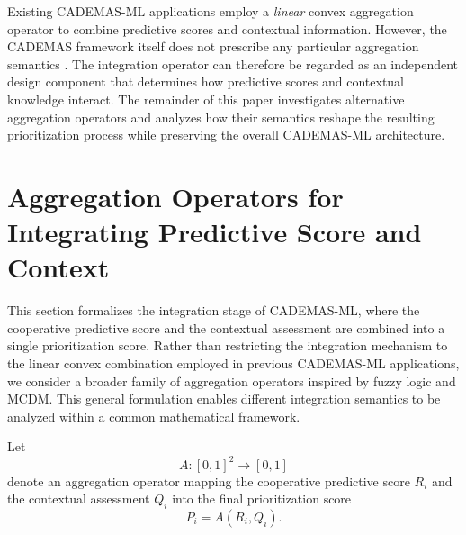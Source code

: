 \documentclass[mathematics,article,submit,moreauthors]{Definitions/mdpi}
\begin{document}
Existing CADEMAS-ML applications employ a \textit{linear} convex aggregation operator to combine predictive scores and contextual information. However, the CADEMAS framework itself does not prescribe any particular aggregation semantics \citep{NovoaHernandez2026}. The integration operator can therefore be regarded as an independent design component that determines how predictive scores and contextual knowledge interact. The remainder of this paper investigates alternative aggregation operators and analyzes how their semantics reshape the resulting prioritization process while preserving the overall CADEMAS-ML architecture.


\section{Aggregation Operators for Integrating Predictive Score and Context}
\label{sect:aggregation_operators}

This section formalizes the integration stage of CADEMAS-ML, where the cooperative predictive score and the contextual assessment are combined into a single prioritization score. Rather than restricting the integration mechanism to the linear convex combination employed in previous CADEMAS-ML applications, we consider a broader family of aggregation operators inspired by fuzzy logic and MCDM. This general formulation enables different integration semantics to be analyzed within a common mathematical framework.

Let
\[
A:[0,1]^2 \rightarrow [0,1]
\]
denote an aggregation operator mapping the cooperative predictive score $R_i$ and the contextual assessment $Q_i$ into the final prioritization score
\[
P_i = A(R_i,Q_i).
\]
\end{document}
